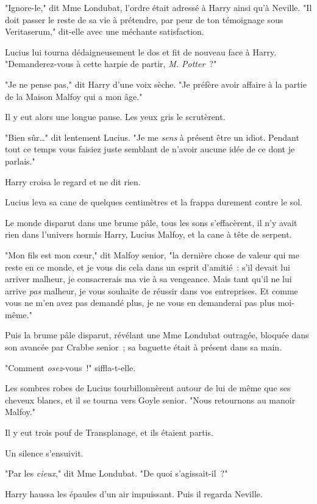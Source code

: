"Ignore-le," dit Mme Londubat, l'ordre était adressé à Harry ainsi qu'à Neville. "Il doit passer le reste de sa vie à prétendre, par peur de ton témoignage sous Veritaserum," dit-elle avec une méchante satisfaction.

Lucius lui tourna dédaigneusement le dos et fit de nouveau face à Harry. "Demanderez-vous à cette harpie de partir, \emph{M. Potter}~?"

"Je ne pense pas," dit Harry d'une voix sèche. "Je préfère avoir affaire à la partie de la Maison Malfoy qui a mon âge."

Il y eut alors une longue pause. Les yeux gris le scrutèrent.

"Bien sûr…" dit lentement Lucius. "Je me \emph{sens} à présent être un idiot. Pendant tout ce temps vous faisiez juste semblant de n'avoir aucune idée de ce dont je parlais."

Harry croisa le regard et ne dit rien.

Lucius leva sa cane de quelques centimètres et la frappa durement contre le sol.

Le monde disparut dans une brume pâle, tous les sons s'effacèrent, il n'y avait rien dans l'univers hormis Harry, Lucius Malfoy, et la cane à tête de serpent.

"Mon fils est mon cœur," dit Malfoy senior, "la dernière chose de valeur qui me reste en ce monde, et je vous dis cela dans un esprit d'amitié~: s'il devait lui arriver malheur, je consacrerais ma vie à sa vengeance. Mais tant qu'il ne lui arrive \emph{pas} malheur, je vous souhaite de réussir dans vos entreprises. Et comme vous ne m'en avez pas demandé plus, je ne vous en demanderai pas plus moi-même."

Puis la brume pâle disparut, révélant une Mme Londubat outragée, bloquée dans son avancée par Crabbe senior~; sa baguette était à présent dans sa main.

"Comment \emph{osez}-vous~!" siffla-t-elle.

Les sombres robes de Lucius tourbillonnèrent autour de lui de même que ses cheveux blancs, et il se tourna vers Goyle senior. "Nous retournons au manoir Malfoy."

Il y eut trois pouf de Transplanage, et ils étaient partis.

Un silence s'ensuivit.

"Par les \emph{cieux}," dit Mme Londubat. "De quoi s'agissait-il~?"

Harry haussa les épaules d'un air impuissant. Puis il regarda Neville.

